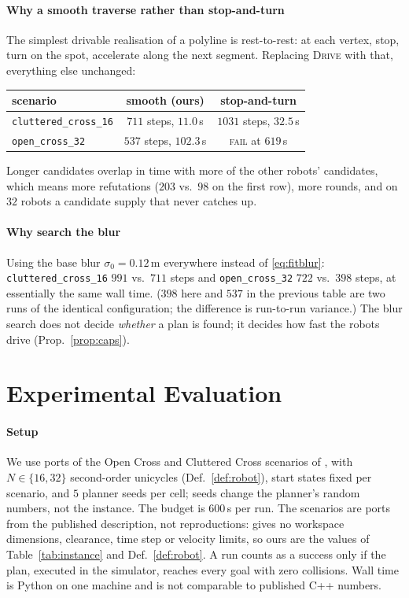 \documentclass[conference]{IEEEtran}
\theoremstyle{plain}
\theoremstyle{definition}
\begin{document}
\paragraph*{Why a smooth traverse rather than stop-and-turn}
The simplest drivable realisation of a polyline is rest-to-rest: at each vertex, stop, turn on
the spot, accelerate along the next segment. Replacing \textsc{Drive} with that, everything
else unchanged:
\begin{center}
\small
\setlength{\tabcolsep}{3.5pt}
\begin{tabular}{lcc}
\toprule
scenario & smooth (ours) & stop-and-turn \\
\midrule
\texttt{cluttered\_cross\_16} & $711$ steps, $11.0$\,s & $1031$ steps, $32.5$\,s \\
\texttt{open\_cross\_32} & $537$ steps, $102.3$\,s & \textsc{fail} at $619$\,s \\
\bottomrule
\end{tabular}
\end{center}
Longer candidates overlap in time with more of the other robots' candidates, which means more
refutations ($203$ vs.\ $98$ on the first row), more rounds, and on $32$ robots a candidate
supply that never catches up.

\paragraph*{Why search the blur}
Using the base blur $\sigma_0 = 0.12$\,m everywhere instead of \eqref{eq:fitblur}:
\texttt{cluttered\_cross\_16} $991$ vs.\ $711$ steps and \texttt{open\_cross\_32} $722$ vs.\
$398$ steps, at essentially the same wall time. ($398$ here and $537$ in the previous table are
two runs of the identical configuration; the difference is run-to-run variance.) The blur search does not decide
\emph{whether} a plan is found; it decides how fast the robots drive (Prop.~\ref{prop:caps}).

\section{Experimental Evaluation}
\label{sec:experiments}

\paragraph*{Setup}
We use ports of the Open Cross and Cluttered Cross scenarios of \cite{karc2025}, with
$N \in \{16, 32\}$
second-order unicycles (Def.~\ref{def:robot}), start states fixed per scenario, and $5$
planner seeds per cell; seeds change the planner's random numbers, not the instance. The
budget is $600$\,s per run. The scenarios are ports from the published description, not
reproductions: \cite{karc2025} gives no workspace dimensions, clearance, time step or velocity
limits, so ours are the values of Table~\ref{tab:instance} and Def.~\ref{def:robot}. A run counts as a success only if the plan, executed in the
simulator, reaches every goal with zero collisions. Wall time is Python on one machine and is
not comparable to published C++ numbers.
\end{document}
